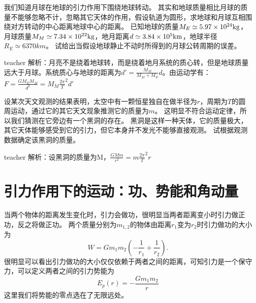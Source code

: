 \begin{example}
我们知道月球在地球的引力作用下围绕地球转动。
其实和地球质量相比月球的质量不能够忽略不计，忽略其它天体的作用，假设轨道为圆形，求地球和月球互相围绕对方转动的中心距离地球中心的距离。
已知地球的质量$M_E\simeq 5.97\times 10^{24}{\rm{kg}}$，月球质量$M_M\simeq 7.34\times 10^{22}{\rm{kg}}$，地月距离$d\simeq 3.84\times 10^{5}{\rm{km}}$，地球半径$R_E\simeq 6370\unit{km}$。
试给出当假设地球静止不动时所得到的月球公转周期的误差。
\begin{taggedblock}{teacher}
\newline
解析：月亮不是绕着地球转，而是绕着地月系统的质心转，但是地球质量远大于月球。系统质心与地球的距离为$d'=\frac{M_M}{M_M+M_E}d$。由运动学有：$F=\frac{GM_EM_M}{d^2}=M_M\frac{2\pi}{T}^2d'$
\end{taggedblock}
\end{example}


\begin{example}
设某次天文观测的结果表明，太空中有一颗恒星独自在做半径为$r$，周期为$T$的圆周运动，通过它的其它天文现象推测它的质量为$m$。
这明显不符合运动定律，所以我们猜测在它旁边有一个黑洞的存在。
黑洞是这样一种天体，它的质量极大，其它天体能够感受到它的引力，但它本身并不发光不能够直接观测。
试根据观测数据确定该黑洞的质量。
\begin{taggedblock}{teacher}
\newline
解析：设黑洞的质量为M，$\frac{GMm}{r^2}=m\frac{2\pi}{T}^2r$
\end{taggedblock}
\end{example}

\section{引力作用下的运动：功、势能和角动量}
当两个物体的距离发生变化时，引力会做功，很明显当两者距离变小时引力做正功，反之将做正功。
两个质量分别为$m_{1,2}$的物体由距离$r_1$变为$r_2$时引力做功的大小为
\begin{equation}
W = Gm_1m_2\left(-\frac{1}{r_1}+\frac{1}{r_2}\right).
\end{equation}
很明显可以看出引力做功的大小仅仅依赖于两者之间的距离，可知引力是一个保守力，可以定义两者之间的引力势能为
\begin{equation}
E_p(r)=-\frac{Gm_1m_2}{r}
\end{equation}
这里我们将势能的零点选在了无限远处。

